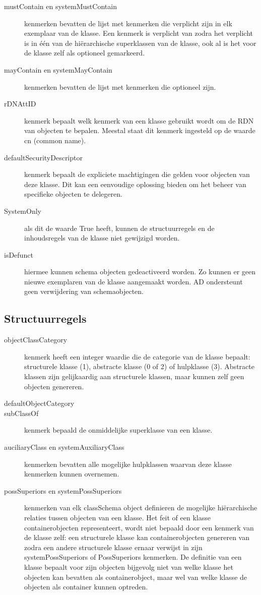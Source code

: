 \begin{description}
	\item[mustContain en systemMustContain] kenmerken bevatten de lijst
		met kenmerken die verplicht zijn in elk exemplaar van de klasse.
		Een kenmerk is verplicht van zodra het verplicht is in één van
		de hiërarchische superklassen van de klasse, ook al is het voor
		de klasse zelf als optioneel gemarkeerd.
	\item[mayContain en systemMayContain] kenmerken bevatten de lijst met
		kenmerken die optioneel zijn.
	\item[rDNAttID] kenmerk bepaalt welk kenmerk van een klasse gebruikt
		wordt om de RDN van objecten te bepalen. Meestal staat dit
		kenmerk ingesteld op de waarde cn (common name).
	\item[defaultSecurityDescriptor] kenmerk bepaalt de expliciete
		machtigingen die gelden voor objecten van deze klasse. Dit kan
		een eenvoudige oplossing bieden om het beheer van specifieke
		objecten te delegeren.
	\item[SystemOnly] als dit de waarde True heeft, kunnen de
		structuurregels en de inhoudsregels van de klasse niet gewijzigd
		worden.
	\item[isDefunct] hiermee kunnen schema objecten gedeactiveerd
		worden. Zo kunnen er geen nieuwe exemplaren van de klasse
		aangemaakt worden. AD ondersteunt geen verwijdering van
		schemaobjecten.
\end{description}

\subsection{Structuurregels}
\begin{description}
	\item[objectClassCategory] kenmerk heeft een integer waardie die de
		categorie van de klasse bepaalt: structurele klasse (1),
		abstracte klasse (0 of 2) of hulpklasse (3). Abstracte klassen
		zijn gelijkaardig aan structurele klassen, maar kunnen zelf geen
		objecten genereren.
	\item[defaultObjectCategory]
	\item[subClassOf] kenmerk bepaald de onmiddelijke superklasse van een
		klasse.
	\item[auciliaryClass en systemAuxiliaryClass] kenmerken bevatten alle
		mogelijke hulpklassen waarvan deze klasse kenmerken kunnen
		overnemen.
	\item[possSuperiors en systemPossSuperiors] kenmerken van elk
		classSchema object definieren de mogelijke hiërarchische
		relaties tussen objecten van een klasse. Het feit of een klasse
		containerobjecten representeert, wordt niet bepaald door een
		kenmerk van de klasse zelf: een structurele klasse kan
		containerobjecten genereren van zodra een andere structurele
		klasse ernaar verwijst in zijn systemPossSuperiors of
		PossSuperiors kenmerken. De definitie van een klasse bepaalt
		voor zijn objecten bijgevolg niet van welke klasse het objecten
		kan bevatten als containerobject, maar wel van welke klasse de
		objecten als container kunnen optreden.
\end{description}


